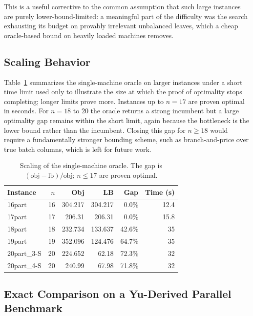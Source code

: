 \documentclass[review,3p,times,authoryear]{elsarticle}
\begin{document}
This is a useful corrective to the common assumption that such large instances are
purely lower-bound-limited: a meaningful part of the difficulty was the search
exhausting its budget on provably irrelevant unbalanced leaves, which a cheap
oracle-based bound on heavily loaded machines removes.

\subsection{Scaling Behavior}
\label{subsec:res_scaling}

Table~\ref{tab:scale} summarizes the single-machine oracle on larger instances
under a short time limit used only to illustrate the size at which the proof of
optimality stops completing; longer limits prove more. Instances up to $n=17$
are proven optimal in seconds. For $n=18$ to $20$ the oracle returns a strong
incumbent but a large optimality gap remains within the short limit, again
because the bottleneck is the lower bound rather than the incumbent. Closing
this gap for $n\ge 18$ would require a fundamentally stronger bounding scheme,
such as branch-and-price over true batch columns, which is left for future work.

\begin{table}[t]
	\centering
	\caption{Scaling of the single-machine oracle. The gap is
		$(\text{obj}-\text{lb})/\text{obj}$; $n\le 17$ are proven optimal.}
	\label{tab:scale}
	\begin{tabular}{l r r r r r}
		\toprule
		Instance & $n$ & Obj & LB & Gap & Time (s) \\
		\midrule
		16part      & 16 & 304.217 & 304.217 & 0.0\%  & 12.4 \\
		17part      & 17 & 206.31  & 206.31  & 0.0\%  & 15.8 \\
		18part      & 18 & 232.734 & 133.637 & 42.6\% & 35 \\
		19part      & 19 & 352.096 & 124.476 & 64.7\% & 35 \\
		20part\_3-S & 20 & 224.652 & 62.18   & 72.3\% & 32 \\
		20part\_4-S & 20 & 240.99  & 67.98   & 71.8\% & 32 \\
		\bottomrule
	\end{tabular}
\end{table}

\subsection{Exact Comparison on a Yu-Derived Parallel Benchmark}
\label{subsec:res_yubench}
\end{document}
